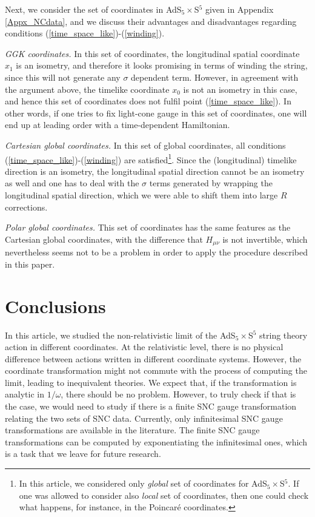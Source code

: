 \documentclass[12pt]{article}
\numberwithin{equation}{section}
\begin{document}
Next, we consider the set of coordinates in AdS$_5\times$S$^5$ given in Appendix \ref{Appx_NCdata}, and we discuss their advantages and disadvantages regarding conditions (\ref{time_space_like})-(\ref{winding}). 

\vspace{2mm}
\emph{GGK coordinates.} In this set of coordinates, the longitudinal spatial coordinate $x_1$ is an isometry, and therefore it looks promising in terms of winding the string, since this will not generate any $\sigma$ dependent term. However, in agreement with the argument above, the timelike coordinate $x_0$ is not an isometry in this case, and hence this set of coordinates does not fulfil point (\ref{time_space_like}). In other words, if one tries to fix light-cone gauge in this set of coordinates, one will end up at leading order with a time-dependent Hamiltonian.   

\vspace{2mm}
\emph{Cartesian global coordinates.} In this set of global coordinates, all conditions (\ref{time_space_like})-(\ref{winding}) are satisfied\footnote{In this article, we considered only \emph{global} set of coordinates for AdS$_5\times$S$^5$. If one was allowed to consider also \emph{local} set of coordinates, then one could check what happens, for instance, in the Poincar\'e coordinates.}.  Since the (longitudinal) timelike direction is an isometry, the longitudinal spatial direction cannot be an isometry as well and one has to deal with the $\sigma$ terms generated by wrapping the longitudinal spatial direction, which we were able to shift them into large $R$ corrections. 

\vspace{2mm}
\emph{Polar global coordinates.} This set of coordinates has the same features as the Cartesian global coordinates, with the difference that $H_{\mu\nu}$ is not invertible, which nevertheless seems not to be a problem in order to apply the procedure described in this paper.  





\section{Conclusions}
\label{sec:conclusions}


In this article, we studied the non-relativistic limit of the  AdS$_5\times$S$^5$ string theory action in different coordinates. At the relativistic level, there is no physical difference between actions written in different coordinate systems. However, the coordinate transformation might not commute with the process of computing the limit, leading to inequivalent theories. We expect that, if the transformation is analytic in $1/\omega$, there should be no problem. However, to truly check if that is the case, we would need to study if there is a finite SNC gauge transformation relating the two sets of SNC data.
Currently, only infinitesimal SNC gauge transformations are available in the literature. The finite SNC gauge transformations can be computed by exponentiating the infinitesimal ones, which is a task that we leave for future research.
\end{document}
